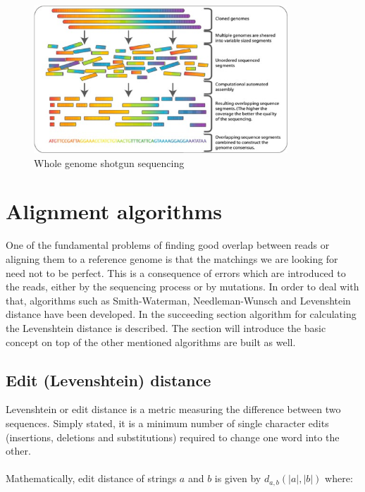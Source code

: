 \documentclass[times, utf8, diplomski]{fer}
\begin{document}
\begin{figure}[!ht]
\begin{center}
	\includegraphics[width=0.85\textwidth]{../img/Whole_genome_shotgun_sequencing.png}
	\caption{Whole genome shotgun sequencing\cite{shotgun.sequencing.img}}\label{shotgun.sequencing}
\end{center}
\end{figure}

\section{Alignment algorithms}

One of the fundamental problems of finding good overlap between reads or aligning them to a reference genome is that the matchings we are looking for need not to be perfect. This is a consequence of errors which are introduced to the reads, either by the sequencing process or by mutations. In order to deal with that, algorithms such as Smith-Waterman\cite{Smith1981195}, Needleman-Wunsch\cite{nw}  and Levenshtein distance\cite{edit.distance.tutorial} have been developed. In the succeeding section algorithm for calculating the Levenshtein distance is described. The section will introduce the basic concept on top of the other mentioned algorithms are built as well.

\subsection{Edit (Levenshtein) distance}
\label{edit.distance.algo}

Levenshtein or edit distance is a metric measuring the difference between two sequences. Simply stated, it is a minimum number of single character edits (insertions, deletions and substitutions) required to change one word into the other.
\\
\\
Mathematically, edit distance of strings $a$ and $b$ is given by $d_{a,b}(|a|,|b|)$ where:
\end{document}
